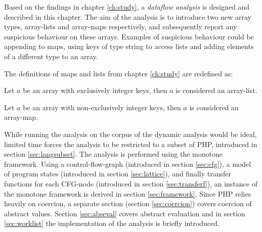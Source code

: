 Based on the findings in chapter \ref{ch:study}, a \emph{dataflow analysis} is designed and described in this chapter. The aim of the analysis is to introduce two new array types, array-lists and array-maps respectively, and subsequently report any suspicious behaviour on these arrays. Examples of suspicious behaviour could be appending to maps, using keys of type string to access lists and adding elements of a different type to an array.

The definitions of maps and lists from chapter \ref{ch:study} are redefined as:

\begin{definition}
Let $a$ be an array with exclusively integer keys, then $a$ is considered an array-list.
\end{definition}

\begin{definition}
Let $a$ be an array with non-exclusively integer keys, then $a$ is considered an array-map.
\end{definition}

While running the analysis on the corpus of the dynamic analysis would be ideal, limited time forces the analysis to be restricted to a subset of PHP, introduced in section \ref{sec:langsubset}. The analysis is performed using the monotone framework. Using a control-flow-graph (introduced in section \ref{sec:cfg}), a model of program states (introduced in section \ref{sec:lattice}), and finally transfer functions for each CFG-node (introduced in section \ref{sec:transferf}), an instance of the monotone framework is derived in section \ref{sec:framework}. Since PHP relies heavily on coercion, a separate section (section \ref{sec:coercion}) covers coercion of abstract values. Section \ref{sec:abseval} covers abstract evaluation and in section \ref{sec:worklist} the implementation of the analysis is briefly introduced.
